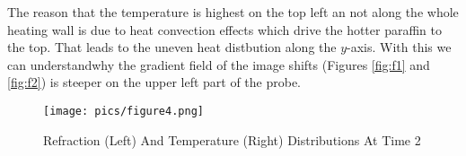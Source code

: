 The reason that the temperature is highest on the top left an not along the whole heating wall is due to heat convection effects which drive the hotter paraffin to the top. That leads to the uneven heat distbution along the $y$-axis. With this we can understandwhy the gradient field of the image shifts (Figures \ref{fig:f1} and \ref{fig:f2}) is steeper on the upper left part of the probe.

\begin{figure}[H]
\centering
\texttt{[image: pics/figure4.png]}
\caption{Refraction (Left) And Temperature (Right) Distributions At Time 2}
\label{fig:f4}
\end{figure}